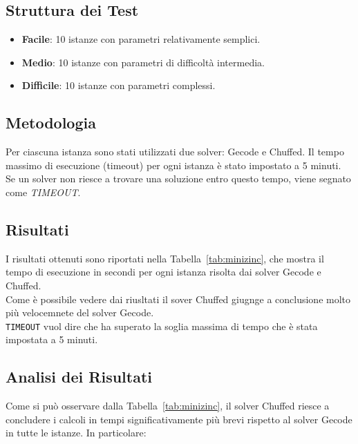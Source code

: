 \documentclass{article}
\begin{document}
\begin{multicols*}{2}
\subsection{Struttura dei Test}

\begin{itemize}
    \item \textbf{Facile}: 10 istanze con parametri relativamente semplici.
    \item \textbf{Medio}: 10 istanze con parametri di difficoltà intermedia.
    \item \textbf{Difficile}: 10 istanze con parametri complessi.
\end{itemize}

\subsection{Metodologia}

Per ciascuna istanza sono stati utilizzati due solver: Gecode e Chuffed. Il tempo massimo di esecuzione (timeout) per ogni istanza è stato impostato a 5 minuti. Se un solver non riesce a trovare una soluzione entro questo tempo, viene segnato come \textit{TIMEOUT}.

\subsection{Risultati}
I risultati ottenuti sono riportati nella Tabella~\ref{tab:minizinc}, che mostra il tempo di esecuzione in secondi per ogni istanza risolta dai solver Gecode e Chuffed.
\\
Come è possibile vedere dai riusltati il sover Chuffed giugnge a conclusione molto più velocemnete del solver Gecode.
\\
\texttt{TIMEOUT} vuol dire che ha superato la soglia massima di tempo che è stata impostata a 5 minuti.

\subsection{Analisi dei Risultati}
Come si può osservare dalla Tabella~\ref{tab:minizinc}, il solver Chuffed riesce a concludere i calcoli in tempi significativamente più brevi rispetto al solver Gecode in tutte le istanze. In particolare:


\end{multicols*}
\end{document}
